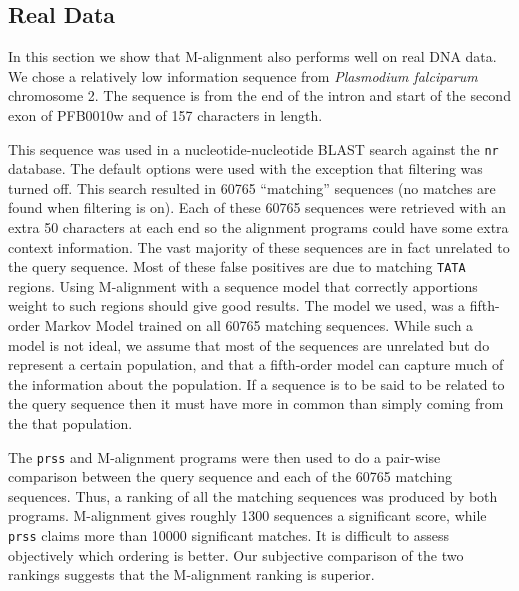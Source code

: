 \documentclass[a4paper,11pt,oneside]{article}
\begin{document}
\subsection{Real Data}

In this section we show that M-alignment also performs well on real DNA data.
We chose a relatively low information sequence from \emph{Plasmodium
falciparum} chromosome 2.  The sequence is from the end of the intron and
start of the second exon of PFB0010w and of 157 characters in length.


This sequence was used in a nucleotide-nucleotide BLAST search against the
\verb!nr! database.  The default options were used with the exception that
filtering was turned off.  This search resulted in 60765 ``matching''
sequences (no matches are found when filtering is on).  Each of these 60765
sequences were retrieved with an extra 50 characters at each end so the
alignment programs could have some extra context information.  The vast
majority of these sequences are in fact unrelated to the query sequence.  Most
of these false positives are due to matching \verb!TATA! regions.  Using
M-alignment with a sequence model that correctly apportions weight to such
regions should give good results.  The model we used, was a fifth-order Markov
Model trained on all 60765 matching sequences.  While such a model is not
ideal, we assume that most of the sequences are unrelated but do represent a
certain population, and that a fifth-order model can capture much of the
information about the population.  If a sequence is to be said to be related
to the query sequence then it must have more in common than simply coming from
the that population.

The \verb!prss! and M-alignment programs were then used to do a pair-wise
comparison between the query sequence and each of the 60765 matching
sequences.  Thus, a ranking of all the matching sequences was produced by both
programs.  M-alignment gives roughly 1300 sequences a significant score, while
\verb!prss! claims more than 10000 significant matches.  It is difficult
to assess objectively which ordering is better.  Our subjective comparison of
the two rankings suggests that the M-alignment ranking is superior.
\end{document}

